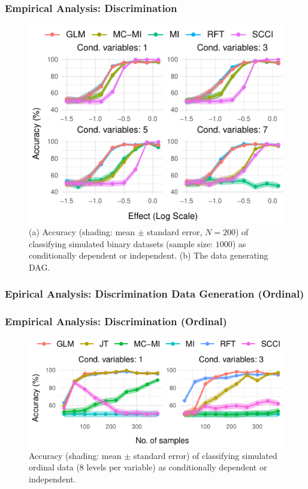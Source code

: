 \documentclass{beamer}
\begin{document}
\begin{frame}
	\frametitle{Empirical Analysis: Discrimination}
	\begin{figure}
		\centering
		\includegraphics{imgs/accuracy.pdf}
		\caption*{(a) Accuracy (shading: mean $\pm$ standard error, $N=200$)
		of classifying simulated binary datasets (sample size: $1000$)
		as conditionally dependent or independent. (b) The data generating DAG.}
	\end{figure}

\end{frame}

\begin{frame}
	\frametitle{Epirical Analysis: Discrimination Data Generation (Ordinal)}
\end{frame}

\begin{frame}
	\frametitle{Empirical Analysis: Discrimination (Ordinal)}
	\begin{figure}
		\centering
		\includegraphics{imgs/accuracy_ordinal.pdf}
		\caption*{Accuracy (shading: mean $\pm$ standard error) of
		classifying simulated ordinal data (8 levels per variable) as
		conditionally dependent or independent.}	
	\end{figure}
\end{frame}
\end{document}
